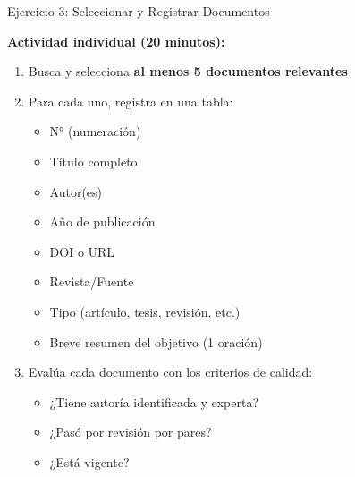 \documentclass[11pt,aspectratio=169]{beamer}
\begin{document}
\begin{frame}{Ejercicio 3: Seleccionar y Registrar Documentos}

	\textbf{Actividad individual (20 minutos):}


	\begin{enumerate}
		\item Busca y selecciona \textbf{al menos 5 documentos relevantes}

		\item Para cada uno, registra en una tabla:
		      \begin{itemize}
			      \item N° (numeración)
			      \item Título completo
			      \item Autor(es)
			      \item Año de publicación
			      \item DOI o URL
			      \item Revista/Fuente
			      \item Tipo (artículo, tesis, revisión, etc.)
			      \item Breve resumen del objetivo (1 oración)
		      \end{itemize}

		\item Evalúa cada documento con los criterios de calidad:
		      \begin{itemize}
			      \item ¿Tiene autoría identificada y experta?
			      \item ¿Pasó por revisión por pares?
			      \item ¿Está vigente?
		      \end{itemize}
	\end{enumerate}
\end{frame}

\end{document}
